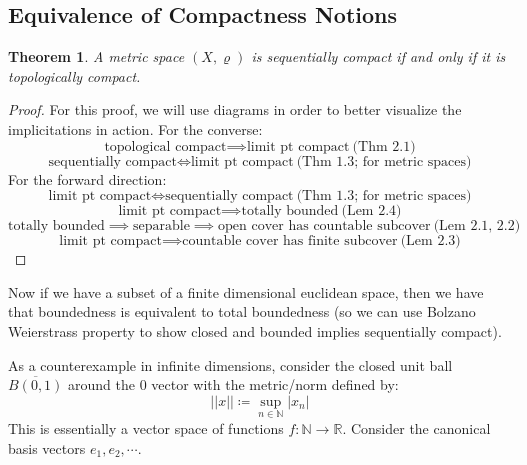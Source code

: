 \documentclass[10pt,letterpaper]{article} %
\newtheorem{thm}{Theorem}[section]
\begin{document}
\subsection{Equivalence of Compactness Notions}
\begin{thm}
A metric space $(X, \varrho)$ is sequentially compact if and only if it is topologically compact.
\end{thm}
\begin{proof}
For this proof, we will use diagrams in order to better visualize the implicitations in action. For the converse:
\begin{equation*}
\text{topological compact} \implies \text{limit pt compact} \ \text{(Thm 2.1)}
\end{equation*}
\begin{equation*}
\text{sequentially compact} \iff \text{limit pt compact} \ \text{(Thm 1.3; for metric spaces)}
\end{equation*}
For the forward direction:
\begin{equation*}
\text{limit pt compact} \iff \text{sequentially compact} \ \text{(Thm 1.3; for metric spaces)} 
\end{equation*}
\begin{equation*}
\text{limit pt compact} \implies \text{totally bounded} \ \text{(Lem 2.4)}
\end{equation*}
\begin{equation*}
\text{totally bounded} \implies \text{separable} \implies \text{open cover has countable subcover} \ \text{(Lem 2.1, 2.2)}
\end{equation*}
\begin{equation*}
\text{limit pt compact} \implies \text{countable cover has finite subcover} \ \text{(Lem 2.3)}
\end{equation*}
\end{proof}
Now if we have a subset of a finite dimensional euclidean space, then we have that boundedness is equivalent to total boundedness
(so we can use Bolzano Weierstrass property to show closed and bounded implies sequentially compact).

As a counterexample in infinite dimensions, consider the closed unit ball $\overline{B(0, 1)}$ around the $0$ vector with the metric/norm defined by:
\begin{equation*}
||x|| \coloneq \sup_{n \in \mathbb{N}}|x_n|
\end{equation*}
This is essentially a vector space of functions $f: \mathbb{N} \xrightarrow{} \mathbb{R}$. Consider the canonical basis vectors $e_1, e_2, \cdots$.
\end{document}

